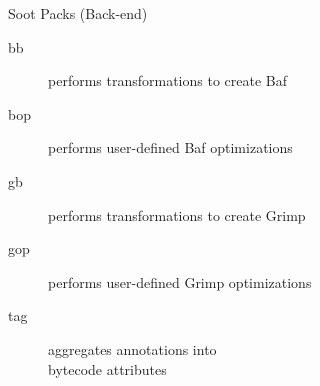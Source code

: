 \begin{slide}{Soot Packs (Back-end)}
\begin{description}
\item[bb] performs transformations to create Baf
\item[bop] performs user-defined Baf optimizations
\end{description}
\begin{description}
\item[gb] performs transformations to create Grimp
\item[gop] performs user-defined Grimp optimizations
\end{description}
\begin{description}
\item[tag] aggregates annotations into \\bytecode attributes
\end{description}
\end{slide}



